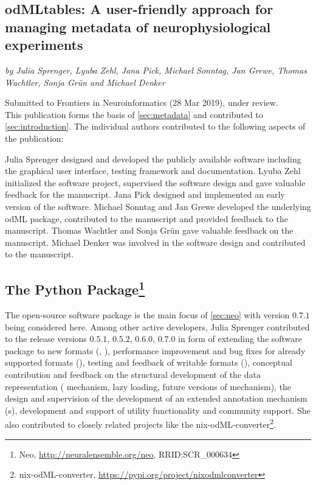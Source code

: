 \clearpage
\subsection*{odMLtables: A user-friendly approach for managing metadata of neurophysiological experiments}
\textit{by Julia Sprenger, Lyuba Zehl, Jana Pick, Michael Sonntag, Jan Grewe, Thomas Wachtler, Sonja Grün and Michael Denker}

Submitted to Frontiers in Neuroinformatics (28 Mar 2019), under review.\\

This publication forms the basis of \cref{sec:metadata} and contributed to \cref{sec:introduction}. The individual authors contributed to the following aspects of the publication:

Julia Sprenger designed and developed the publicly available software including the graphical user interface, testing framework and documentation. Lyuba Zehl initialized the software project, supervised the software design and gave valuable feedback for the manuscript. Jana Pick designed and implemented an early version of the software. Michael Sonntag and Jan Grewe developed the underlying odML package, contributed to the manuscript and provided feedback to the manuscript. Thomas Wachtler and Sonja Grün gave valuable feedback on the manuscript. Michael Denker was involved in the software design and contributed to the manuscript.\\

\vspace{2cm}
\subsection*{The  Python Package\footnote{Neo, \url{http://neuralensemble.org/neo}, RRID:SCR\_000634}}
The open-source software package  \citep{Garcia_2014} is the main focus of \cref{sec:neo}  with version $0.7.1$ being considered here. Among other active  developers, Julia Sprenger contributed to the release versions $0.5.1$, $0.5.2$, $0.6.0$, $0.7.0$ in form of extending the software package to new formats (, ), performance improvement and bug fixes for already supported formats (), testing and feedback of writable formats (), conceptual contribution and feedback on the structural development of the data representation ( mechanism, lazy loading, future versions of  mechanism), the design and supervision of the development of an extended annotation mechanism (s), development and support of utility functionality and community support. She also contributed to closely related projects like the nix-odML-converter\footnote{nix-odML-converter, \url{https://pypi.org/project/nixodmlconverter}}.

